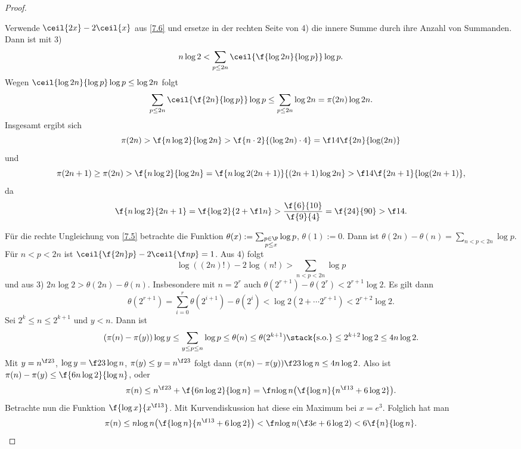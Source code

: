 \begin{st}[Tschebyscheff, 1850]
\begin{proof}
\begin{enumerate}[1)]
				Verwende $\ceil{2x} - 2 \ceil{x}$ aus \ref{7.6} und ersetze in der rechten Seite von 4) die innere Summe durch ihre Anzahl von Summanden.
				Dann ist mit 3)
				\[
					n \log 2 < \sum_{p \le 2n} \ceil{\f {\log 2n}{\log p}} \log p.
				\]
				Wegen $\ceil{\log 2n}{\log p} \log p \le \log 2n$ folgt
				\[
					\sum_{p \le 2n} \ceil{\f{2n}{\log p}} \log p
					\le \sum_{p \le 2n} \log 2n
					= \pi(2n) \log 2n.
				\]
				Insgesamt ergibt sich
				\[
					\pi(2n) > \f {n \log 2}{\log 2n}
					> \f{n \cdot 2}{(\log 2n) \cdot 4}
					= \f 14 \f {2n}{\log(2n)}
				\]
				und
				\[
					\pi(2n + 1) \ge \pi(2n)
					> \f{n\log 2}{\log 2n}
					= \f {n \log 2 (2n + 1)}{(2n + 1) \log 2n}
					> \f 14 \f{2n + 1}{\log(2n + 1)},
				\]
				da
				\[
					\f {n\log 2}{2n + 1}
					= \f{\log 2}{2 + \f 1n}
					> \dfrac {\f {6}{10}}{\f{9}{4}}
					= \f{24}{90}
					> \f 14.
				\]
		\end{enumerate}
		Für die rechte Ungleichung von \ref{7.5} betrachte die Funktion $\theta(x) := \sum_{\substack{p\in \P \\ p \le x}} \log p$, $\theta(1) := 0$.
		Dann ist $\theta(2n) - \theta(n) = \sum_{n < p < 2n} \log p$.
		Für $n < p < 2n$ ist $\ceil{\f {2n}p} - 2 \ceil{\f np} = 1$.
		Aus 4) folgt
		\[
			\log((2n)!) - 2 \log(n!)
			> \sum_{n<p<2n} \log p
		\]
		und aus 3) $2n \log 2 > \theta(2n) - \theta(n)$.
		Insbesondere mit $n = 2^r$ auch $\theta(2^{r+1}) - \theta(2^r) < 2^{r+1} \log 2$.
		Es gilt dann
		\[
			\theta(2^{r+1})
			= \sum_{i = 0}^r \theta(2^{i+1}) - \theta(2^i)
			< \log 2 (2 + \dotsb 2^{r+1})
			< 2^{r+2} \log 2.
		\]
		Sei $2^k \le n \le 2^{k+1}$ und $y < n$.
		Dann ist
		\[
			(\pi(n) - \pi(y))\log y
			\le \sum_{y \le p \le n} \log p
			\le \theta(n)
			\le \theta(2^{k+1})
			\stack{\text{s.o.}}\le 2^{k+2} \log 2
			\le 4 n \log 2.
		\]
		Mit $y = n^{\f 23}$, $\log y = \f 23 \log n$, $\pi(y) \le y = n^{\f 23}$ folgt dann $(\pi(n) - \pi(y)) \f 23 \log n	\le 4 n \log 2$.
		Also ist $\pi(n) - \pi(y) \le \f{6n \log 2}{\log n}$, oder
		\[
			\pi(n) \le n^{\f 23} + \f {6n \log 2}{\log n}
			= \f n{\log n}\big( \f {\log n}{n^{\f 13} + 6 \log 2} \big).
		\]
		Betrachte nun die Funktion $\f {\log x}{x^{\f 13}}$.
		Mit Kurvendiskussion hat diese ein Maximum bei $x = e^3$.
		Folglich hat man
		\[
			\pi(n) \le n {\log n} \big( \f {\log n}{n^{\f 13} + 6 \log 2} \big)
			< \f n{\log n} (\f 3e + 6 \log 2)
			< 6 \f {n}{\log n}.
		\]
	\end{proof}
\end{st}


